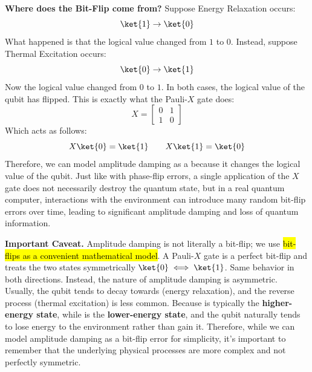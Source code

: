 \highspace
\textcolor{Green3}{ \textbf{Where does the Bit-Flip come from?}} Suppose Energy Relaxation occurs:
\begin{equation*}
    \ket{1} \to \ket{0}
\end{equation*}
What happened is that the logical value changed from $1$ to $0$. Instead, suppose Thermal Excitation occurs:
\begin{equation*}
    \ket{0} \to \ket{1}
\end{equation*}
Now the logical value changed from $0$ to $1$. In both cases, the logical value of the qubit has flipped. This is exactly what the Pauli-$X$ gate does:
\begin{equation*}
    X = \begin{bmatrix}
        0 & 1 \\
        1 & 0
    \end{bmatrix}
\end{equation*}
Which acts as follows:
\begin{equation*}
    X\ket{0} = \ket{1} \qquad X\ket{1} = \ket{0}
\end{equation*}
Therefore, we can model amplitude damping as a  because it changes the logical value of the qubit. Just like with phase-flip errors, a single application of the $X$ gate does not necessarily destroy the quantum state, but in a real quantum computer, interactions with the environment can introduce many random bit-flip errors over time, leading to significant amplitude damping and loss of quantum information.

\highspace
\textcolor{DarkOrange3}{ \textbf{Important Caveat.}} Amplitude damping is not literally a bit-flip; we use \hl{bit-flips as a convenient mathematical model}. A Pauli-$X$ gate is a perfect bit-flip and treats the two states symmetrically $\ket{0} \iff \ket{1}$. Same behavior in both directions. Instead, the nature of amplitude damping is asymmetric. Usually, the qubit  tends to decay towards  (energy relaxation), and the reverse process (thermal excitation) is less common. Because  is typically the \textbf{higher-energy state}, while  is the \textbf{lower-energy state}, and the qubit naturally tends to lose energy to the environment rather than gain it. Therefore, while we can model amplitude damping as a bit-flip error for simplicity, it's important to remember that the underlying physical processes are more complex and not perfectly symmetric.

